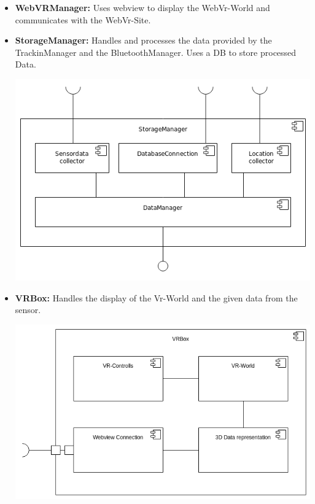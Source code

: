 \begin{itemize}
  \item \textbf{WebVRManager:} Uses webview to display the WebVr-World and communicates with the WebVr-Site.
  \item \textbf{StorageManager:} Handles and processes the data provided by the TrackinManager and the BluetoothManager. Uses a DB to store processed Data.
  \begin{center}
  	\includegraphics[scale=0.4]{pics/StorageMgr_Composition.png}
  \end{center}
  \item \textbf{VRBox:} Handles the display of the Vr-World and the given data from the sensor.
  \begin{center}
	\includegraphics[scale=0.35]{pics/VRBox.png}
  \end{center}
\end{itemize}



